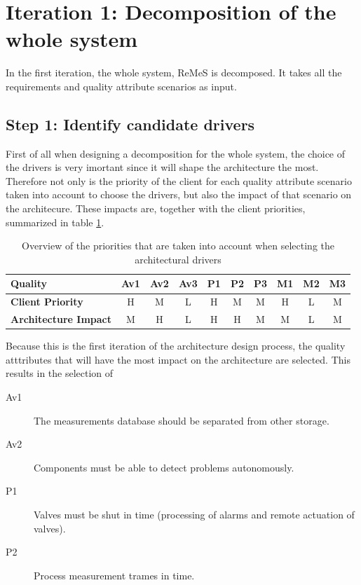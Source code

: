 \section{Iteration 1: Decomposition of the whole system}
\label{add:it1}

\npar In the first iteration, the whole system, ReMeS is decomposed. It takes
all the requirements and quality attribute scenarios as input.

\subsection{Step 1: Identify candidate drivers}
\label{add:it1/drivers}

\npar First of all when designing a decomposition for the whole system, the
choice of the drivers is very imortant since it will shape the architecture the
most. Therefore not only is the priority of the client for each quality
attribute scenario taken into account to choose the drivers, but also the impact of
that scenario on the architecure. These impacts are, together with the client
priorities, summarized in table \ref{table:add/it1/priorities}.

\begin{table}[H]
	\begin{center}
		\begin{tabular}{|l|c|c|c|c|c|c|c|c|c|}
		\hline
		\textbf{Quality}			&	Av1	&	Av2	&	Av3	&	P1	&	P2	&	P3	&	M1	&	M2	&	M3	\\
		\hline
		\textbf{Client Priority}	&	H	&	M	&	L	&	H	&	M	&	M	&	H	&	L	&	M	\\
		\hline
		\textbf{Architecture Impact}&	M	&	H	&	L	&	H	&	H	&	M	&	M	&	L	&	M	\\
		\hline
		\end{tabular}
		\caption{Overview of the priorities that are taken into account when
		selecting the architectural drivers}
		\label{table:add/it1/priorities}
	\end{center}
\end{table}

\npar Because this is the first iteration of the architecture design process,
the quality atttributes that will have the most impact on the architecture
are selected. This results in the selection of
\begin{description}
  	\item[Av1] The measurements database should be separated from other storage. 
  	\item[Av2] Components must be able to detect problems autonomously.
  	\item[P1] Valves must be shut in time (processing of alarms and remote
  	actuation of valves).
  	\item[P2] Process measurement trames in time. 
\end{description}

